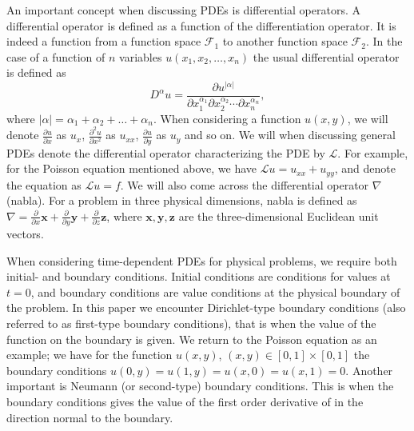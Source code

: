An important concept when discussing PDEs is differential operators.
A differential operator is defined as a function of the differentiation operator.
It is indeed a function from a function space $\mathcal{F}_1$ to another function space $\mathcal{F}_2$.
In the case of a function of $n$ variables $u(x_1, x_2, \ldots , x_n)$ the usual differential operator is defined as 
\begin{equation*}
    D^\alpha u = \frac{\partial u^{|\alpha|}}{\partial x_1^{\alpha_1} \partial x_2^{\alpha_2} \cdots \partial x_n^{\alpha_n}},
\end{equation*}
where $|\alpha| = \alpha_1 + \alpha_2 + \ldots + \alpha_n$.
When considering a function $u(x,y)$, we will denote $\frac{\partial u}{\partial x}$ as $u_x$, $\frac{\partial^2 u}{\partial x^2}$ as $u_{xx}$, $\frac{\partial u}{\partial y}$ as $u_y$ and so on.
We will when discussing general PDEs denote the differential operator characterizing the PDE by $\mathcal{L}$.
For example, for the Poisson equation mentioned above, we have $\mathcal{L}u = u_{xx} + u_{yy}$, and denote the equation as $\mathcal{L}u=f$.
We will also come across the differential operator $\nabla$ (nabla).
For a problem in three physical dimensions, nabla is defined as $\nabla = \frac{\partial}{\partial x}\boldsymbol{x} + \frac{\partial}{\partial y}\boldsymbol{y} + \frac{\partial}{\partial z}\boldsymbol{z}$, where $\boldsymbol{x},\boldsymbol{y},\boldsymbol{z}$ are the three-dimensional Euclidean unit vectors.

When considering time-dependent PDEs for physical problems, we require both initial- and boundary conditions.
Initial conditions are conditions for values at $t=0$, and boundary conditions are value conditions at the physical boundary of the problem.
In this paper we encounter Dirichlet-type boundary conditions (also referred to as first-type boundary conditions), that is when the value of the function on the boundary is given.
We return to the Poisson equation as an example;
we have for the function $u(x,y)$, $(x,y) \in [0,1]\times [0,1]$ the boundary conditions $u(0,y)=u(1,y)=u(x,0)=u(x,1) = 0$.
Another important is Neumann (or second-type) boundary conditions.
This is when the boundary conditions gives the value of the first order derivative of in the direction normal to the boundary.


